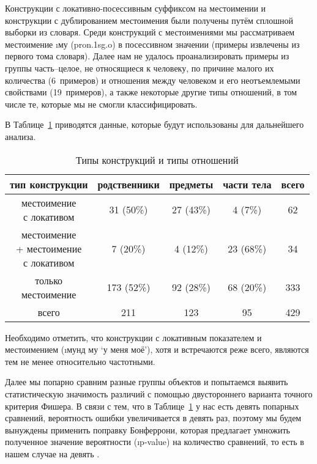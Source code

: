 Конструкции с локативно-посессивным суффиксом на местоимении и конструкции с дублированием местоимения были получены путём сплошной выборки из словаря. Среди конструкций с местоимениями мы рассматриваем местоимение \i{му} ({\sc pron.1sg.o}) в посессивном значении (примеры извлечены из первого тома словаря). Далее нам не удалось проанализировать примеры из группы часть–целое, не относящиеся к человеку, по причине малого их количества (6~примеров) и отношения между человеком и его неотъемлемыми свойствами (19~примеров), а также некоторые другие типы отношений, в том числе те, которые мы не смогли классифицировать.

В Таблице~\ref{tab:poss4} приводятся данные, которые будут использованы для дальнейшего анализа.

\begin{table}[h]
 \centering
 \caption{Типы конструкций и типы отношений}
 \smallskip
 \label{tab:poss4}
 \begin{tabular}{c|ccc|c} \toprule
 тип конструкции & родственники & предметы & части тела & всего \\ \midrule
 \makecell[c]{местоимение\\с локативом} & 31 (50\%) & 27 (43\%) & 4 (7\%) & 62 \\
 \makecell[c]{местоимение\\+ местоимение\\с локативом} & 7 (20\%) & 4 (12\%) &  23 (68\%) & 34 \\
 \makecell[c]{только\\местоимение} & 173 (52\%) & 92 (28\%) & 68 (20\%) & 333 \\ \midrule
 всего & 211 & 123 & 95 & 429 \\ \bottomrule
 \end{tabular}
\end{table}

\pagebreak[4]

Необходимо отметить, что конструкции с локативным показателем и местоимением (\i{мунд му} ‘у меня моё’), хотя и встречаются реже всего, являются тем не менее относительно частотными.

Далее мы попарно сравним разные группы объектов и попытаемся выявить статистическую значимость различий с помощью двустороннего варианта точного критерия Фишера. В связи с тем, что в Таблице~\ref{tab:poss4} у нас есть девять попарных сравнений, вероятность ошибки увеличивается в девять раз, поэтому мы будем вынуждены применить поправку Бонферрони, которая предлагает умножить полученное значение вероятности (\i{p}-value) на количество сравнений, то есть в нашем случае на девять \parencite[350]{lehmann_romano2005}.

